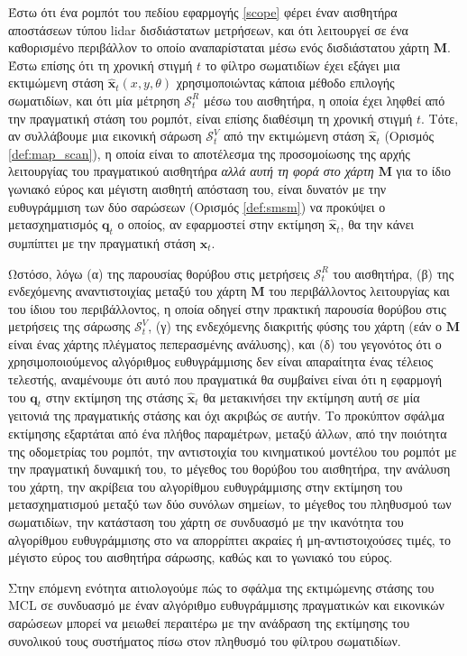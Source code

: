 Έστω ότι ένα ρομπότ του πεδίου εφαρμογής \ref{scope} φέρει έναν αισθητήρα
αποστάσεων τύπου lidar δισδιάστατων μετρήσεων, και ότι λειτουργεί σε ένα
καθορισμένο περιβάλλον το οποίο αναπαρίσταται μέσω ενός δισδιάστατου χάρτη
$\bm{M}$. Έστω επίσης ότι τη χρονική στιγμή $t$ το φίλτρο σωματιδίων έχει
εξάγει μια εκτιμώμενη στάση $\hat{\bm{x}}_t(x,y,\theta)$ χρησιμοποιώντας κάποια
μέθοδο επιλογής σωματιδίων, και ότι μία μέτρηση $\mathcal{S}^R_t$ μέσω του
αισθητήρα, η οποία έχει ληφθεί από την πραγματική στάση του ρομπότ, είναι
επίσης διαθέσιμη τη χρονική στιγμή $t$. Τότε, αν συλλάβουμε μια εικονική σάρωση
$\mathcal{S}^V_t$ από την εκτιμώμενη στάση $\hat{\bm{x}}_t$ (Ορισμός
\ref{def:map_scan}), η οποία είναι το αποτέλεσμα της προσομοίωσης της αρχής
λειτουργίας του πραγματικού αισθητήρα \textit{αλλά αυτή τη φορά στο χάρτη
$\bm{M}$} για το ίδιο γωνιακό εύρος και μέγιστη αισθητή απόσταση του, είναι
δυνατόν με την ευθυγράμμιση των δύο σαρώσεων (Ορισμός \ref{def:smsm})
να προκύψει ο μετασχηματισμός $\bm{q}_t$ ο οποίος, αν εφαρμοστεί στην εκτίμηση
$\hat{\bm{x}}_t$, θα την κάνει συμπίπτει με την πραγματική στάση $\bm{x}_t$.

Ωστόσο, λόγω (α) της παρουσίας θορύβου στις μετρήσεις $\mathcal{S}^R_t$ του
αισθητήρα, (β) της ενδεχόμενης αναντιστοιχίας μεταξύ του χάρτη $\bm{M}$ του
περιβάλλοντος λειτουργίας και του ίδιου του περιβάλλοντος, η οποία οδηγεί στην
πρακτική παρουσία θορύβου στις μετρήσεις της σάρωσης $\mathcal{S}^V_t$, (γ) της
ενδεχόμενης διακριτής φύσης του χάρτη (εάν ο $\bm{M}$ είναι ένας χάρτης
πλέγματος πεπερασμένης ανάλυσης), και (δ) του γεγονότος ότι ο χρησιμοποιούμενος
αλγόριθμος ευθυγράμμισης δεν είναι απαραίτητα ένας τέλειος τελεστής, αναμένουμε
ότι αυτό που πραγματικά θα συμβαίνει είναι ότι η εφαρμογή του $\bm{q}_t$ στην
εκτίμηση της στάσης $\hat{\bm{x}}_t$ θα μετακινήσει την εκτίμηση αυτή σε μία
γειτονιά της πραγματικής στάσης και όχι ακριβώς σε αυτήν. Το προκύπτον σφάλμα
εκτίμησης εξαρτάται από ένα πλήθος παραμέτρων, μεταξύ άλλων, από την ποιότητα
της οδομετρίας του ρομπότ, την αντιστοιχία του κινηματικού μοντέλου του ρομπότ
με την πραγματική δυναμική του, το μέγεθος του θορύβου του αισθητήρα, την
ανάλυση του χάρτη, την ακρίβεια του αλγορίθμου ευθυγράμμισης στην εκτίμηση του
μετασχηματισμού μεταξύ των δύο συνόλων σημείων, το μέγεθος του πληθυσμού των
σωματιδίων, την κατάσταση του χάρτη σε συνδυασμό με την ικανότητα του
αλγορίθμου ευθυγράμμισης στο να απορρίπτει ακραίες ή μη-αντιστοιχούσες τιμές,
το μέγιστο εύρος του αισθητήρα σάρωσης, καθώς και το γωνιακό του εύρος.

Στην επόμενη ενότητα αιτιολογούμε πώς το σφάλμα της εκτιμώμενης στάσης
του MCL σε συνδυασμό με έναν αλγόριθμο ευθυγράμμισης πραγματικών και εικονικών
σαρώσεων μπορεί να μειωθεί περαιτέρω με την ανάδραση της εκτίμησης του
συνολικού τους συστήματος πίσω στον πληθυσμό του φίλτρου σωματιδίων.


